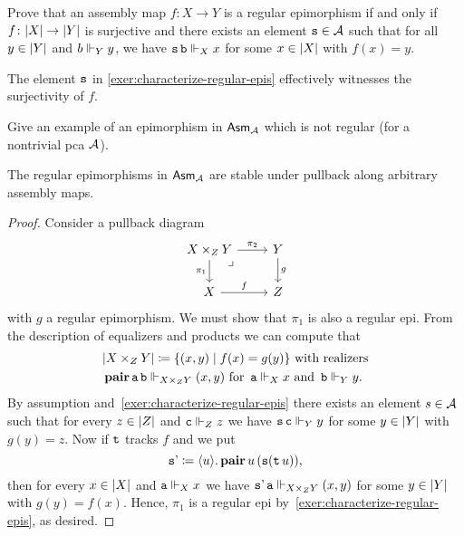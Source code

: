 \begin{exercise}%
  \label{exer:characterize-regular-epis}
  Prove that an assembly map \(f \colon X \to Y\) is a regular epimorphism if
  and only if \(f \colon \carrier{X} \to \carrier{Y}\) is surjective and there
  exists an element \(\pca{s} \in \AA\) such that for all \(y \in \carrier{Y}\)
  and \(b \realizes_Y y\), we have \(\pca{s}\pca{b} \realizes_X x\) for some
  \(x \in \carrier{X}\) with \(f(x) = y\).
\end{exercise}

The element \(\pca{s}\) in \cref{exer:characterize-regular-epis} effectively
witnesses the surjectivity of \(f\).

\begin{exercise}\label{exer:epi-but-not-regular-epi}
  Give an example of an epimorphism in \(\Asm{\AA}\) which is not regular (for a
  nontrivial pca \(\AA\)).
\end{exercise}

\begin{proposition}\label{regular-epi-pullback-stable}
  The regular epimorphisms in \(\Asm{\AA}\) are stable under pullback along
  arbitrary assembly maps.
\end{proposition}
\begin{proof}
  Consider a pullback diagram
  \[
    \begin{tikzcd}
      X \times_Z Y \pbcorner
      \ar[r,"\pi_2"]
      \ar[d,"\pi_1"']
      & Y \ar[d,"g"] \\
      X\ar[r,"f"] & Z
    \end{tikzcd}
  \]
  with \(g\) a regular epimorphism. We must show that \(\pi_1\) is also a
  regular epi.
  From the description of equalizers and products we can compute that
  \begin{align*}
    &\carrier{X \times_Z Y} \coloneq \set{(x,y) \mid f(x) = g(y)}
    \text{ with realizers}\\
    &\pcapair\pca{a}\pca{b} \realizes_{X \times_Z Y} (x,y)
    \text{ for }
    \pca{a} \realizes_X x
    \text{ and }
    \pca{b} \realizes_Y y.
  \end{align*}
  By assumption and~\cref{exer:characterize-regular-epis} there exists an
  element \(s \in \AA\) such that for every \(z \in \carrier{Z}\) and
  \(\pca{c} \realizes_Z z\) we have \(\pca{s}\pca{c} \realizes_Y y\) for some
  \(y \in \carrier{Y}\) with \(g(y) = z\).
  Now if \(\pca{t}\) tracks \(f\) and we put
  \[
    \pca{s'} \coloneq \lambdapca{u}{\pcapair u\,(\pca{s}(\pca{t}u))},
  \]
  then for every \(x \in \carrier{X}\) and \(\pca{a} \realizes_X x\) we have
  \(\pca{s'}\pca{a} \realizes_{X \times_Z Y} (x,y)\) for some
  \(y \in \carrier{Y}\) with \(g(y) = f(x)\).
  Hence, \(\pi_1\) is a regular epi by~\cref{exer:characterize-regular-epis}, as
  desired.
\end{proof}

